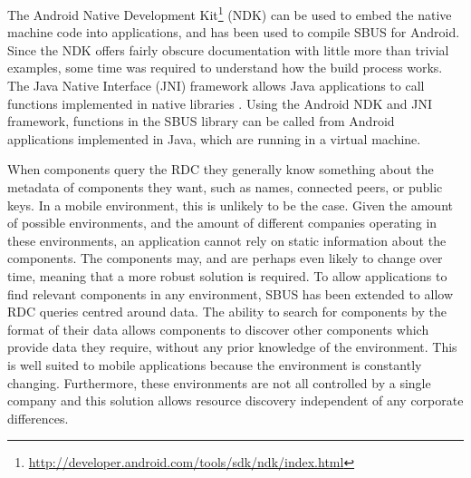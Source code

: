 \documentclass[12pt,twoside,notitlepage]{report}
\begin{document}
The Android Native Development Kit\footnote{\url{http://developer.android.com/tools/sdk/ndk/index.html}} (NDK) can be used to embed the native machine code into applications, and has been used to compile SBUS for Android. 
Since the NDK offers fairly obscure documentation with little more than trivial examples, some time was required to understand how the build process works. 
The Java Native Interface (JNI) framework allows Java applications to call functions implemented in native libraries \cite{liang1999java}. 
Using the Android NDK and JNI framework, functions in the SBUS library can be called from Android applications implemented in Java, which are running in a virtual machine. 

When components query the RDC they generally know something about the metadata of components they want, such as names, connected peers, or public keys. 
In a mobile environment, this is unlikely to be the case. 
Given the amount of possible environments, and the amount of different companies operating in these environments, an application cannot rely on static information about the components. 
The components may, and are perhaps even likely to change over time, meaning that a more robust solution is required. 
To allow applications to find relevant components in any environment, SBUS has been extended to allow RDC queries centred around data. 
The ability to search for components by the format of their data allows components to discover other components which provide data they require, without any prior knowledge of the environment. 
This is well suited to mobile applications because the environment is constantly changing. 
Furthermore, these environments are not all controlled by a single company and this solution allows resource discovery independent of any corporate differences. 
\end{document}
